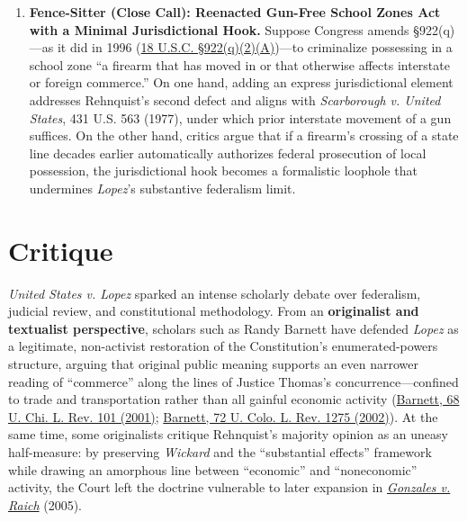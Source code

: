 \documentclass[12pt]{article}
\begin{document}
\begin{enumerate}
\item \textbf{Fence-Sitter (Close Call): Reenacted Gun-Free School Zones Act with a Minimal Jurisdictional Hook.} Suppose Congress amends \S 922(q)---as it did in 1996 (\href{https://www.govregs.com/uscode/expand/title18_partI_chapter44_section922}{18 U.S.C. \S 922(q)(2)(A)})---to criminalize possessing in a school zone ``a firearm that has moved in or that otherwise affects interstate or foreign commerce.'' On one hand, adding an express jurisdictional element addresses Rehnquist's second defect and aligns with \textit{Scarborough v. United States}, 431 U.S. 563 (1977), under which prior interstate movement of a gun suffices. On the other hand, critics argue that if a firearm's crossing of a state line decades earlier automatically authorizes federal prosecution of local possession, the jurisdictional hook becomes a formalistic loophole that undermines \textit{Lopez}'s substantive federalism limit.
\end{enumerate}

\section{Critique}
\textit{United States v. Lopez} sparked an intense scholarly debate over federalism, judicial review, and constitutional methodology. From an \textbf{originalist and textualist perspective}, scholars such as Randy Barnett have defended \textit{Lopez} as a legitimate, non-activist restoration of the Constitution's enumerated-powers structure, arguing that original public meaning supports an even narrower reading of ``commerce'' along the lines of Justice Thomas's concurrence---confined to trade and transportation rather than all gainful economic activity (\href{https://scholarship.law.georgetown.edu/context/facpub/article/1504/viewcontent/barnett_commerce_clause.pdf}{Barnett, 68 U. Chi. L. Rev. 101 (2001)}; \href{https://scholarship.law.georgetown.edu/cgi/viewcontent.cgi?article=1856&context=facpub}{Barnett, 72 U. Colo. L. Rev. 1275 (2002)}). At the same time, some originalists critique Rehnquist's majority opinion as an uneasy half-measure: by preserving \textit{Wickard} and the ``substantial effects'' framework while drawing an amorphous line between ``economic'' and ``noneconomic'' activity, the Court left the doctrine vulnerable to later expansion in \href{https://www.law.cornell.edu/supremecourt/text/03-1454}{\textit{Gonzales v. Raich}} (2005).
\end{document}
